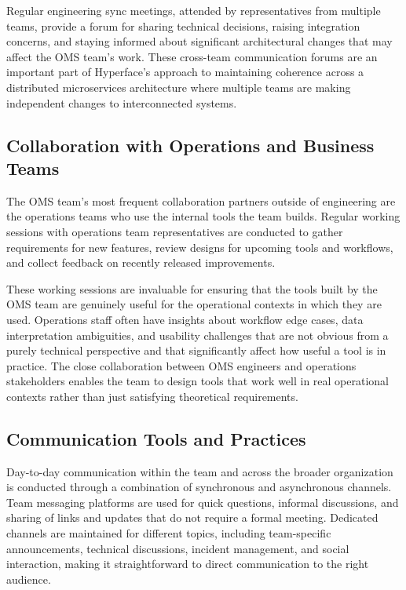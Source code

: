 Regular engineering sync meetings, attended by representatives from multiple teams, provide a forum for sharing technical decisions, raising integration concerns, and staying informed about significant architectural changes that may affect the OMS team's work. These cross-team communication forums are an important part of Hyperface's approach to maintaining coherence across a distributed microservices architecture where multiple teams are making independent changes to interconnected systems.

\subsection{Collaboration with Operations and Business Teams}

The OMS team's most frequent collaboration partners outside of engineering are the operations teams who use the internal tools the team builds. Regular working sessions with operations team representatives are conducted to gather requirements for new features, review designs for upcoming tools and workflows, and collect feedback on recently released improvements.

These working sessions are invaluable for ensuring that the tools built by the OMS team are genuinely useful for the operational contexts in which they are used. Operations staff often have insights about workflow edge cases, data interpretation ambiguities, and usability challenges that are not obvious from a purely technical perspective and that significantly affect how useful a tool is in practice. The close collaboration between OMS engineers and operations stakeholders enables the team to design tools that work well in real operational contexts rather than just satisfying theoretical requirements.

\subsection{Communication Tools and Practices}

Day-to-day communication within the team and across the broader organization is conducted through a combination of synchronous and asynchronous channels. Team messaging platforms are used for quick questions, informal discussions, and sharing of links and updates that do not require a formal meeting. Dedicated channels are maintained for different topics, including team-specific announcements, technical discussions, incident management, and social interaction, making it straightforward to direct communication to the right audience.

